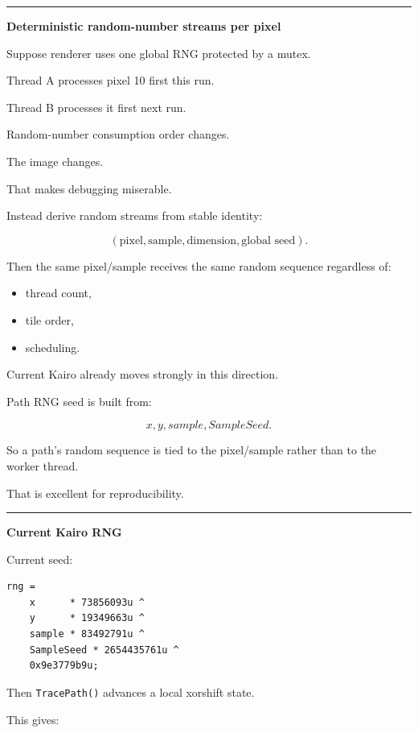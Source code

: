 \begin{center}\rule{0.5\linewidth}{0.5pt}\end{center}

\textbf{Deterministic random-number streams per pixel}

Suppose renderer uses one global RNG protected by a mutex.

Thread A processes pixel 10 first this run.

Thread B processes it first next run.

Random-number consumption order changes.

The image changes.

That makes debugging miserable.

Instead derive random streams from stable identity:

\[
\boxed{
(\text{pixel},\text{sample},\text{dimension},\text{global seed}).
}
\]

Then the same pixel/sample receives the same random sequence regardless of:

\begin{itemize}
\tightlist
\item
  thread count,
\item
  tile order,
\item
  scheduling.
\end{itemize}

Current Kairo already moves strongly in this direction.

Path RNG seed is built from:

\[
x,
y,
sample,
SampleSeed.
\]

So a path's random sequence is tied to the pixel/sample rather than to the worker thread.

That is excellent for reproducibility.

\begin{center}\rule{0.5\linewidth}{0.5pt}\end{center}

\textbf{Current Kairo RNG}

Current seed:

\begin{verbatim}
rng =
    x      * 73856093u ^
    y      * 19349663u ^
    sample * 83492791u ^
    SampleSeed * 2654435761u ^
    0x9e3779b9u;
\end{verbatim}

Then \texttt{TracePath()} advances a local xorshift state.

This gives:

